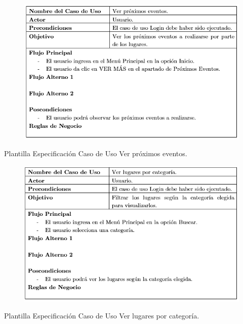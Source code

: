 \documentclass[12pt,letterpaper,openany]{book}
\begin{document}
\begin{table}[H]
\begin{center}
\begin{figure}[H]
\begin{center}
\includegraphics[width=13cm]{./imagenes/PCU/ver_proximos_eventos}
\end{center}
\end{figure}
\end{center}
\caption{Plantilla Especificación Caso de Uso Ver próximos eventos.}
\end{table}

\begin{table}[H]
\begin{center}
\begin{figure}[H]
\begin{center}
\includegraphics[width=13cm]{./imagenes/PCU/ver_lugares_categoria}
\end{center}
\end{figure}
\end{center}
\caption{Plantilla Especificación Caso de Uso Ver lugares por categoría.}
\end{table}
\end{document}

